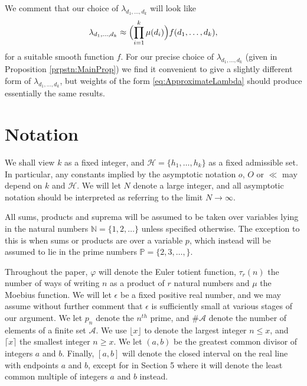 \documentclass[12pt,a4paper]{amsart}
\theoremstyle{plain}
\numberwithin{sblmm}{thrm}
\numberwithin{equation}{section}
\renewcommand{\phi}{\varphi}
\begin{document}
We comment that our choice of $\lambda_{d_1,\dots,d_k}$ will look like
\begin{equation}
\lambda_{d_1,\dots,d_k}\approx \Bigl(\prod_{i=1}^k\mu(d_i)\Bigr)f(d_1,\dots,d_k),\label{eq:ApproximateLambda}
\end{equation}
for a suitable smooth function $f$. For our precise choice of $\lambda_{d_1,\dots,d_k}$ (given in Proposition \ref{prpstn:MainProp}) we find it convenient to give a slightly different form of $\lambda_{d_1,\dots,d_k}$, but weights of the form \eqref{eq:ApproximateLambda} should produce essentially the same results.

\section{Notation}
We shall view $k$ as a fixed integer, and $\mathcal{H}=\{h_1,\dots,h_k\}$ as a fixed admissible set. In particular, any constants implied by the asymptotic notation $o$, $O$ or $\ll$ may depend on $k$ and $\mathcal{H}$. We will let $N$ denote a large integer, and all asymptotic notation should be interpreted as referring to the limit $N\rightarrow\infty$.

All sums, products and suprema will be assumed to be taken over variables lying in the natural numbers $\mathbb{N}=\{1,2,\dots\}$ unless specified otherwise. The exception to this is when sums or products are over a variable $p$, which instead will be assumed to lie in the prime numbers $\mathbb{P}=\{2,3,\dots,\}$.

Throughout the paper, $\phi$ will denote the Euler totient function, $\tau_r(n)$ the number of ways of writing $n$ as a product of $r$ natural numbers and $\mu$ the Moebius function. We will let $\epsilon$ be a fixed positive real number, and we may assume without further comment that $\epsilon$ is sufficiently small at various stages of our argument. We let $p_n$ denote the $n^{th}$ prime, and $\#\mathcal{A}$ denote the number of elements of a finite set $\mathcal{A}$. We use $\lfloor x\rfloor$ to denote the largest integer $n\le x$, and $\lceil x\rceil$ the smallest integer $n\ge x$. We let $(a,b)$ be the greatest common divisor of integers $a$ and $b$. Finally, $[a,b]$ will denote the closed interval on the real line with endpoints $a$ and $b$, except for in Section 5 where it will denote the least common multiple of integers $a$ and $b$ instead.
\end{document}
